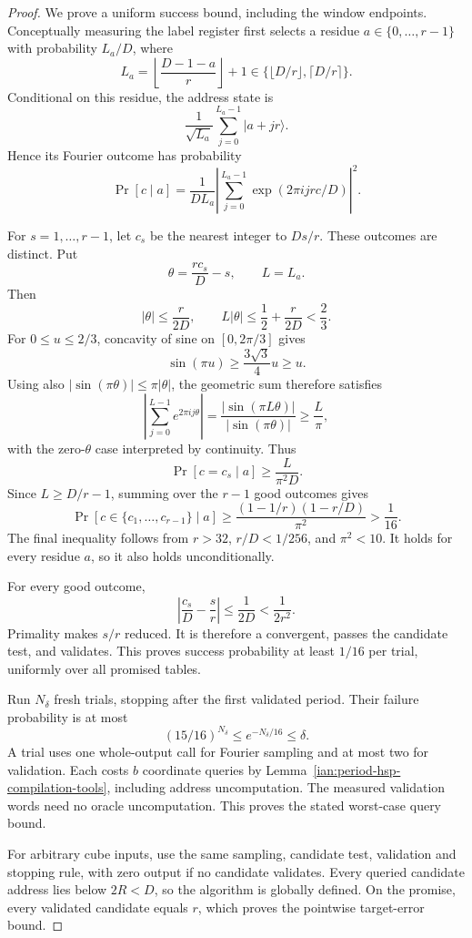 \begin{proof}
We prove a uniform success bound, including the window endpoints.
Conceptually measuring the label register first selects a residue
\(a\in\{0,\ldots,r-1\}\) with probability \(L_a/D\), where
\[
 L_a=\left\lfloor\frac{D-1-a}{r}\right\rfloor+1
 \in\{\lfloor D/r\rfloor,\lceil D/r\rceil\}.
\]
Conditional on this residue, the address state is
\[
 \frac1{\sqrt{L_a}}\sum_{j=0}^{L_a-1}|a+jr\rangle.
\]
Hence its Fourier outcome has probability
\[
 \Pr[c\mid a]
 =
 \frac1{DL_a}
 \left|\sum_{j=0}^{L_a-1}
       \exp(2\pi i jrc/D)\right|^2.
\]

For \(s=1,\ldots,r-1\), let \(c_s\) be the nearest integer to \(Ds/r\).
These outcomes are distinct. Put
\[
 \theta=\frac{rc_s}{D}-s,\qquad L=L_a.
\]
Then
\[
 |\theta|\le\frac r{2D},\qquad
 L|\theta|\le\frac12+\frac r{2D}<\frac23.
\]
For \(0\le u\le2/3\), concavity of sine on \([0,2\pi/3]\) gives
\[
 \sin(\pi u)\ge\frac{3\sqrt3}{4}u\ge u.
\]
Using also \(|\sin(\pi\theta)|\le\pi|\theta|\), the geometric sum therefore satisfies
\[
 \left|\sum_{j=0}^{L-1}e^{2\pi i j\theta}\right|
 =
 \frac{|\sin(\pi L\theta)|}{|\sin(\pi\theta)|}
 \ge\frac L\pi,
\]
with the zero-\(\theta\) case interpreted by continuity. Thus
\[
 \Pr[c=c_s\mid a]\ge\frac L{\pi^2D}.
\]
Since \(L\ge D/r-1\), summing over the \(r-1\) good outcomes gives
\[
 \Pr[c\in\{c_1,\ldots,c_{r-1}\}\mid a]
 \ge
 \frac{(1-1/r)(1-r/D)}{\pi^2}
 >\frac1{16}.
\]
The final inequality follows from \(r>32\), \(r/D<1/256\), and \(\pi^2<10\).
It holds for every residue \(a\), so it also holds unconditionally.

For every good outcome,
\[
 \left|\frac{c_s}{D}-\frac sr\right|
 \le\frac1{2D}<\frac1{2r^2}.
\]
Primality makes \(s/r\) reduced. It is therefore a convergent, passes the candidate test, and validates. This proves success probability at least \(1/16\) per trial, uniformly over all promised tables.

Run \(N_\delta\) fresh trials, stopping after the first validated period.
Their failure probability is at most
\[
 (15/16)^{N_\delta}
 \le e^{-N_\delta/16}\le\delta.
\]
A trial uses one whole-output call for Fourier sampling and at most two for validation. Each costs \(b\) coordinate queries by Lemma~\ref{ian:period-hsp-compilation-tools}, including address uncomputation. The measured validation words need no oracle uncomputation. This proves the stated worst-case query bound.

For arbitrary cube inputs, use the same sampling, candidate test, validation and stopping rule, with zero output if no candidate validates. Every queried candidate address lies below \(2R<D\), so the algorithm is globally defined. On the promise, every validated candidate equals \(r\), which proves the pointwise target-error bound.
\end{proof}

